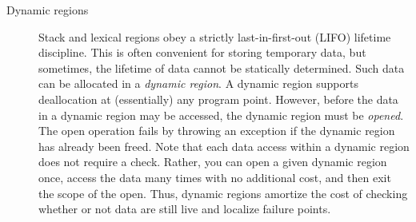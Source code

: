 \begin{description}
\item[Dynamic regions]  Stack and lexical regions obey a strictly
  last-in-first-out (LIFO) lifetime discipline.  This is often
  convenient for storing temporary data, but sometimes, the lifetime
  of data cannot be statically determined.  Such data can be allocated
  in a \emph{dynamic region}.  A dynamic region supports deallocation
  at (essentially) any program point.  However, before the data in a
  dynamic region may be accessed, the dynamic region must be \emph{opened}.
  The open operation fails by throwing an exception if the dynamic
  region has already been freed.  Note that each data access within
  a dynamic region does not require a check.  Rather, you can open
  a given dynamic region once, access the data many times with no
  additional cost, and then exit the scope of the open.  Thus, 
  dynamic regions amortize the cost of checking whether or not data
  are still live and localize failure points.  


 \end{description}

